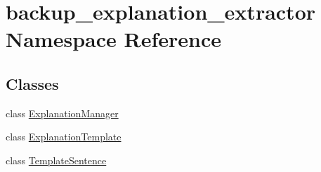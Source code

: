 \hypertarget{namespacebackup__explanation__extractor}{}\section{backup\+\_\+explanation\+\_\+extractor Namespace Reference}
\label{namespacebackup__explanation__extractor}
\subsection*{Classes}
\begin{DoxyCompactItemize}
\item 
class \hyperlink{classbackup__explanation__extractor_1_1_explanation_manager}{Explanation\+Manager}
\item 
class \hyperlink{classbackup__explanation__extractor_1_1_explanation_template}{Explanation\+Template}
\item 
class \hyperlink{classbackup__explanation__extractor_1_1_template_sentence}{Template\+Sentence}
\end{DoxyCompactItemize}
